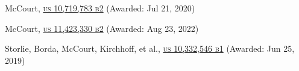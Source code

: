 \begin{patnumerate}
\item \begin{minipage}[t]{\textwidth} McCourt, \href{https://patents.google.com/patent/US10719783B2}{\textsc{us 10,719,783 b2}} (Awarded: Jul 21, 2020)\\
  \end{minipage}

\item \begin{minipage}[t]{\textwidth} McCourt, \href{https://patents.google.com/patent/US11423330B2}{\textsc{us 11,423,330 b2}} (Awarded: Aug 23, 2022)\\
  \end{minipage}

\item \begin{minipage}[t]{\textwidth} Storlie, Borda, McCourt, Kirchhoff, et al., \href{https://patents.google.com/patent/US10332546B1}{\textsc{us 10,332,546 b1}} (Awarded: Jun 25, 2019)\\
  \end{minipage}

\end{patnumerate}
%
